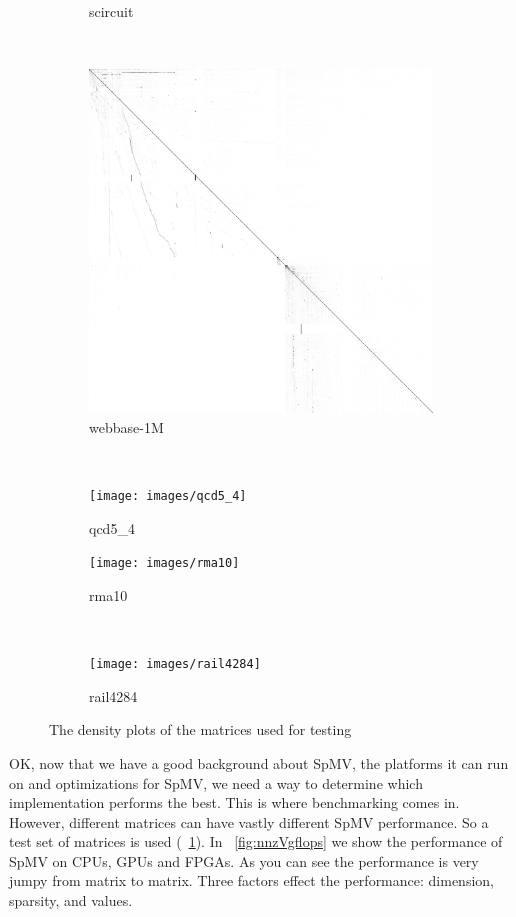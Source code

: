 \begin{figure}
\begin{multicols}{4}
\begin{subfigure}{\linewidth}
\caption{scircuit}
\end{subfigure}~%
\begin{subfigure}{\linewidth}
\includegraphics[width=\linewidth]{images/webbase-1M}
\caption{webbase-1M}
\end{subfigure}~%
\begin{subfigure}{\linewidth}
    \texttt{[image: images/qcd5\_4]}
    \caption{qcd5\_4}
\end{subfigure}
\end{multicols}
\begin{multicols}{4}
\begin{subfigure}{\linewidth}
    \texttt{[image: images/rma10]}
    \caption{rma10}
\end{subfigure}~%
\begin{subfigure}{\linewidth}
    \texttt{[image: images/rail4284]}
    \caption{rail4284}
\end{subfigure}
\end{multicols}

\caption[Matrices]{The density plots of the matrices used for testing}
\label{fig:matrices}
\end{figure}
OK, now that we have a good background about SpMV, the platforms it can run on and optimizations for SpMV, we need a way to determine which implementation performs the best. This is where benchmarking comes in. However, different matrices can have vastly different SpMV performance. So a test set of matrices is used (\figurename~\ref{fig:matrices}). In \figurename~\ref{fig:nnzVgflops} we show the performance of SpMV on CPUs, GPUs and FPGAs. As you can see the performance is very jumpy from matrix to matrix. Three factors effect the performance: dimension, sparsity, and values. \par
